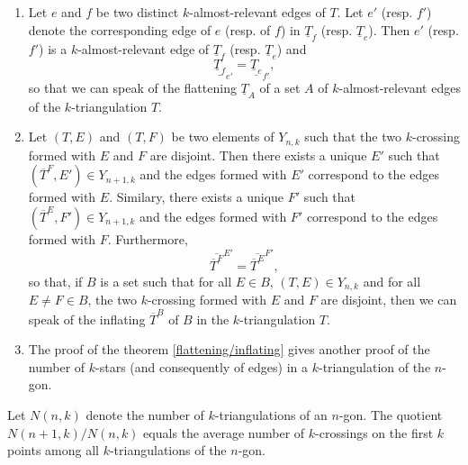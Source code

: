 \documentclass[12pt]{amsart}
\begin{document}
\begin{remark}
\begin{enumerate}
\item Let $e$ and $f$ be two distinct $k$-almost-relevant edges of $T$. Let $e'$ (resp. $f'$) denote the corresponding edge of $e$ (resp. of $f$) in $\underline{T}_f$ (resp. $\underline{T}_e$). Then $e'$ (resp. $f'$) is a $k$-almost-relevant edge of $\underline{T}_f$ (resp. $\underline{T}_e$) and
$$\underline{\underline{T}_f}_{e'}=\underline{\underline{T}_e}_{f'},$$
so that we can speak of the flattening $\underline{T}_{A}$ of a set $A$ of $k$-almost-relevant edges of the $k$-triangulation $T$.

\item Let $(T,E)$ and $(T,F)$ be two elements of $Y_{n,k}$ such that the two $k$-crossing formed with $E$ and $F$ are disjoint. Then there exists a unique $E'$ such that $(\overline{T}^F,E')\in Y_{n+1,k}$ and the edges formed with  $E'$ correspond to the edges formed with $E$. Similary, there exists a unique $F'$ such that $(\overline{T}^E,F')\in Y_{n+1,k}$ and the edges formed with  $F'$ correspond to the edges formed with  $F$. Furthermore,
$$\overline{\overline{T}^F}^{E'}=\overline{\overline{T}^E}^{F'},$$
so that, if $B$ is a set such that for all $E\in B$, $(T,E)\in Y_{n,k}$ and for all $E\ne F\in B$, the two $k$-crossing formed with $E$ and $F$ are disjoint, then we can speak of the inflating $\overline{T}^B$ of $B$ in the $k$-triangulation $T$.

\item The proof of the theorem \ref{flattening/inflating} gives another proof of the number of $k$-stars (and consequently of edges) in a $k$-triangulation of the $n$-gon.
\end{enumerate}
\end{remark}

\begin{corollary}
Let $N(n,k)$ denote the number of $k$-triangulations of an $n$-gon. The quotient $N(n+1,k)/N(n,k)$ equals the average number of $k$-crossings on the first $k$ points among all $k$-triangulations of the $n$-gon.
\end{corollary}
\end{document}
